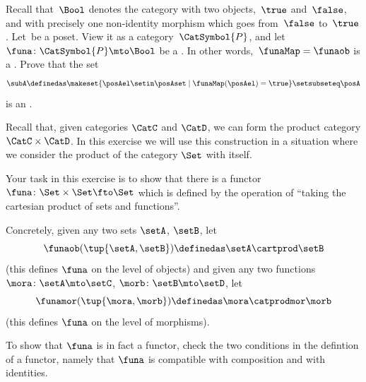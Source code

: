 \begin{gradedexercise}
    \label{ex:UpperSetsViaFunctors}
    Recall that~$\Bool$ denotes the category with two objects,~$\true$ and~$\false$, and with precisely one non-identity morphism which goes from~$\false$ to~$\true$.
    Let~\posA be a poset.
    View it as a category~$\CatSymbol{P}$, and let~$\funa \colon \CatSymbol{P} \mto \Bool$ be a .
    In other words,~$\funaMap = \funaob$ is a .
    Prove that the set
    \begin{equation}
        \subA \definedas \makeset{ \posAel \setin \posAset \mid \funaMap(\posAel) = \true } \setsubseteq \posA
    \end{equation}
    is an .
\end{gradedexercise}

\begin{gradedexercise}
    \label{ex:CartProdAsFunctor}

    Recall that, given categories $\CatC$ and $\CatD$, we can form the product category $\CatC \times \CatD$.
    In this exercise we will use this construction in a situation where we consider the product of the category $\Set$ with itself.

    Your task in this exercise is to show that there is a functor $\funa \colon \Set \times \Set \fto \Set$ which is defined by the operation of ``taking the cartesian product of sets and functions''.

    Concretely, given any two sets $\setA$, $\setB$, let
    \begin{equation*}
        \funaob(\tup{\setA, \setB}) \definedas \setA \cartprod \setB
    \end{equation*}
    (this defines $\funa$ on the level of objects) and given any two functions $\mora \colon \setA \mto \setC$, $\morb \colon \setB \mto \setD$, let
    \begin{equation*}
        \funamor(\tup{\mora, \morb}) \definedas \mora \catprodmor \morb
    \end{equation*}
    (this defines $\funa$ on the level of morphisms).

    To show that $\funa$ is in fact a functor, check the two conditions in the defintion of a functor, namely that $\funa$ is compatible with composition and with identities.
\end{gradedexercise}

